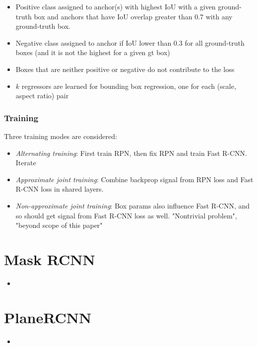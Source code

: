 \begin{itemize}
\item Positive class assigned to anchor(s) with highest IoU with a given ground-truth box and anchors that have IoU overlap greater than 0.7 with any ground-truth box.
\item Negative class assigned to anchor if IoU lower than 0.3 for all ground-truth boxes (and it is not the highest for a given gt box)
\item Boxes that are neither positive or negative do not contribute to the loss
\item $k$ regressors are learned for bounding box regression, one for each (scale, aspect ratio) pair
\end{itemize}

\subsubsection*{Training}
Three training modes are considered:
\begin{itemize}
\item \textit{Alternating training}: First train RPN, then fix RPN and train Fast R-CNN. Iterate
\item \textit{Approximate joint training}: Combine backprop signal from RPN loss and Fast R-CNN loss in shared layers.
\item \textit{Non-approximate joint training}: Box params also influence Fast R-CNN, and so should get signal from Fast R-CNN loss as well. "Nontrivial problem", "beyond scope of this paper"
\end{itemize}

\section*{Mask RCNN \cite{mask_rcnn}}
\begin{itemize}
\item 
\end{itemize}



\section*{PlaneRCNN \cite{plane_rcnn}}
\begin{itemize}
\item 
\end{itemize}



